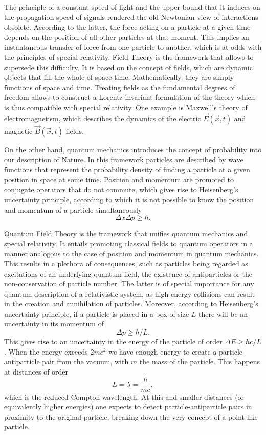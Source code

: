 The principle of a constant speed of light and the upper bound that it induces on the propagation speed of signals rendered the old Newtonian view of interactions obsolete. According to the latter, the force acting on a particle at a given time depends on the position of all other particles at that moment. This implies an instantaneous transfer of force from one particle to another, which is at odds with the principles of special relativity. Field Theory is the framework that allows to supersede this difficulty. It is based on the concept of fields, which are dynamic objects that fill the whole of space-time. Mathematically, they are simply functions of space and time. Treating fields as the fundamental degrees of freedom allows to construct a Lorentz invariant formulation of the theory which is thus compatible with special relativity. One example is Maxwell's theory of electromagnetism, which describes the dynamics of the electric $\vec{E}(\vec{x},t)$ and magnetic $\vec{B}(\vec{x},t)$ fields.

On the other hand, quantum mechanics introduces the concept of probability into our description of Nature. In this framework particles are described by wave functions that represent the probability density of finding a particle at a given position in space at some time. Position and momentum are promoted to conjugate operators that do not commute, which gives rise to Heisenberg's uncertainty principle, according to which it is not possible to know the position and momentum of a particle simultaneously
\begin{equation*}
\Delta x\Delta p\geq\hbar.
\end{equation*} 

Quantum Field Theory is the framework that unifies quantum mechanics and special relativity. It entails promoting classical fields to quantum operators in a manner analogous to the case of position and momentum in quantum mechanics. This results in a plethora of consequences, such as particles being regarded as excitations of an underlying quantum field, the existence of antiparticles or the non-conservation of particle number. The latter is of special importance for any quantum description of a relativistic system, as high-energy collisions can result in the creation and annihilation of  particles. Moreover, according to Heisenberg's uncertainty principle, if a particle is placed in a box of size $L$ there will be an uncertainty in its momentum of
\begin{equation*}
\Delta p\geq\hbar/L.
\end{equation*}
This gives rise to an uncertainty in the energy of the particle of order $\Delta E\geq\hbar c/L$. When the energy exceeds $2mc^2$ we have enough energy to create a particle-antiparticle pair from the vacuum, with $m$ the mass of the particle. This happens at distances of order 
\begin{equation*}
L=\lambda=\frac{\hbar}{mc},
\end{equation*}
which is the reduced Compton wavelength. At this and smaller distances (or equivalently higher energies) one expects to detect particle-antiparticle pairs in proximity to the original particle, breaking down the very concept of a point-like particle. 

